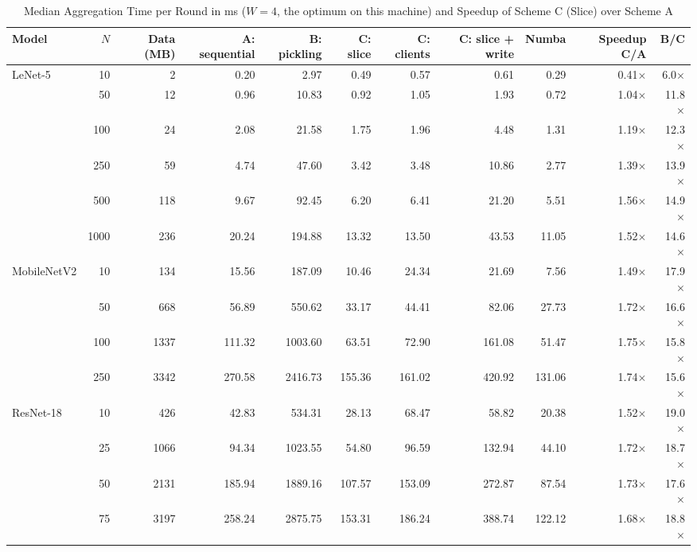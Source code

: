 \documentclass[conference]{IEEEtran}
\begin{document}
\begin{table}[t]
\caption{Median Aggregation Time per Round in ms ($W=4$, the optimum on this machine) and Speedup of Scheme C (Slice) over Scheme A}
\label{tab:main}
\centering
\footnotesize
\begin{tabular}{@{}lrrrrrrrrrr@{}}
\toprule
Model & $N$ & Data (MB) & A: sequential & B: pickling & C: slice & C: clients & C: slice + write & Numba & Speedup C/A & B/C \\
\midrule
\multirow{6}{*}{LeNet-5}
 & 10 & 2 & 0.20 & 2.97 & 0.49 & 0.57 & 0.61 & 0.29 & 0.41$\times$ & 6.0$\times$ \\
 & 50 & 12 & 0.96 & 10.83 & 0.92 & 1.05 & 1.93 & 0.72 & 1.04$\times$ & 11.8$\times$ \\
 & 100 & 24 & 2.08 & 21.58 & 1.75 & 1.96 & 4.48 & 1.31 & 1.19$\times$ & 12.3$\times$ \\
 & 250 & 59 & 4.74 & 47.60 & 3.42 & 3.48 & 10.86 & 2.77 & 1.39$\times$ & 13.9$\times$ \\
 & 500 & 118 & 9.67 & 92.45 & 6.20 & 6.41 & 21.20 & 5.51 & 1.56$\times$ & 14.9$\times$ \\
 & 1000 & 236 & 20.24 & 194.88 & 13.32 & 13.50 & 43.53 & 11.05 & 1.52$\times$ & 14.6$\times$ \\
\midrule
\multirow{4}{*}{MobileNetV2}
 & 10 & 134 & 15.56 & 187.09 & 10.46 & 24.34 & 21.69 & 7.56 & 1.49$\times$ & 17.9$\times$ \\
 & 50 & 668 & 56.89 & 550.62 & 33.17 & 44.41 & 82.06 & 27.73 & 1.72$\times$ & 16.6$\times$ \\
 & 100 & 1337 & 111.32 & 1003.60 & 63.51 & 72.90 & 161.08 & 51.47 & 1.75$\times$ & 15.8$\times$ \\
 & 250 & 3342 & 270.58 & 2416.73 & 155.36 & 161.02 & 420.92 & 131.06 & 1.74$\times$ & 15.6$\times$ \\
\midrule
\multirow{4}{*}{ResNet-18}
 & 10 & 426 & 42.83 & 534.31 & 28.13 & 68.47 & 58.82 & 20.38 & 1.52$\times$ & 19.0$\times$ \\
 & 25 & 1066 & 94.34 & 1023.55 & 54.80 & 96.59 & 132.94 & 44.10 & 1.72$\times$ & 18.7$\times$ \\
 & 50 & 2131 & 185.94 & 1889.16 & 107.57 & 153.09 & 272.87 & 87.54 & 1.73$\times$ & 17.6$\times$ \\
 & 75 & 3197 & 258.24 & 2875.75 & 153.31 & 186.24 & 388.74 & 122.12 & 1.68$\times$ & 18.8$\times$ \\
\bottomrule
\end{tabular}
\end{table}
\end{document}
